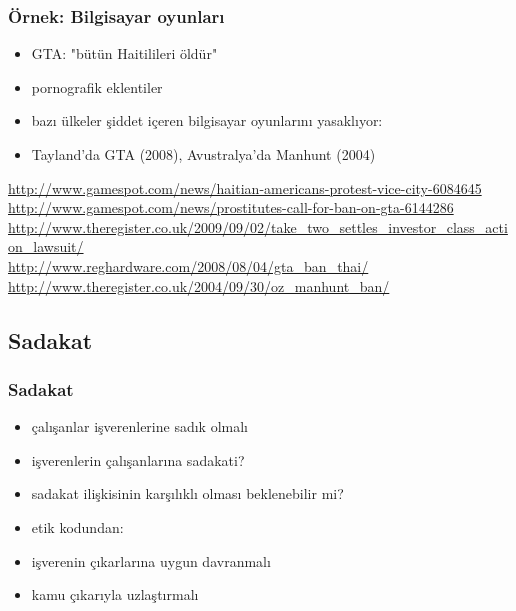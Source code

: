 \documentclass[dvipsnames]{beamer}
\theoremstyle{plain}
\begin{document}
\begin{frame}
  \frametitle{Örnek: Bilgisayar oyunları}

  \begin{itemize}
    \item GTA: "bütün Haitilileri öldür"
    \item pornografik eklentiler

    \bigskip
    \item bazı ülkeler şiddet içeren bilgisayar oyunlarını yasaklıyor:
    \item Tayland'da GTA (2008), Avustralya'da Manhunt (2004)
  \end{itemize}

  \medskip
  \tiny{\url{http://www.gamespot.com/news/haitian-americans-protest-vice-city-6084645}}\\
  \tiny{\url{http://www.gamespot.com/news/prostitutes-call-for-ban-on-gta-6144286}}\\
  \tiny{\url{http://www.theregister.co.uk/2009/09/02/take_two_settles_investor_class_action_lawsuit/}}\\
  \tiny{\url{http://www.reghardware.com/2008/08/04/gta_ban_thai/}}\\
  \tiny{\url{http://www.theregister.co.uk/2004/09/30/oz_manhunt_ban/}}\\
\end{frame}

\subsection{Sadakat}

\begin{frame}
  \frametitle{Sadakat}

  \begin{itemize}
    \item çalışanlar işverenlerine sadık olmalı

    \medskip
    \item işverenlerin çalışanlarına sadakati?
    \item sadakat ilişkisinin karşılıklı olması beklenebilir mi?

    \pause
    \bigskip
    \item etik kodundan:
    \smallskip
    \item işverenin çıkarlarına uygun davranmalı
    \item kamu çıkarıyla uzlaştırmalı
  \end{itemize}
\end{frame}
\end{document}
